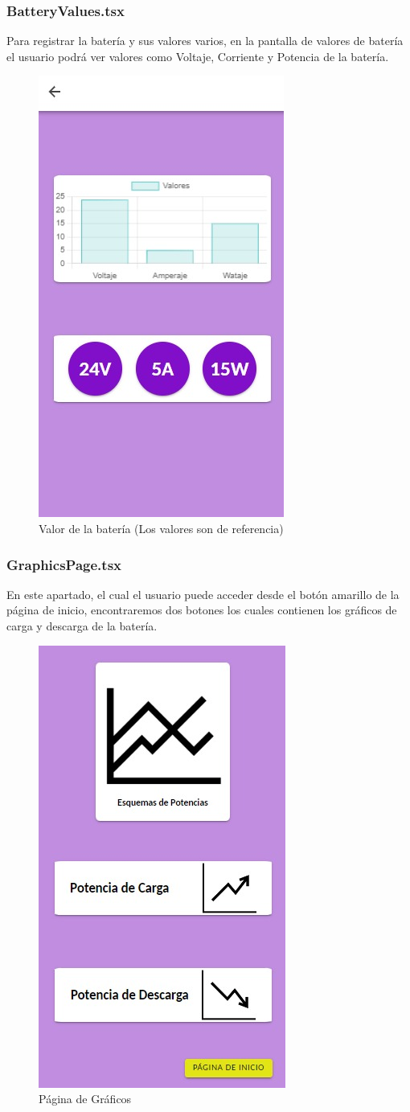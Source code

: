                 \subsubsection{BatteryValues.tsx}
                    Para registrar la batería y sus valores varios, en la pantalla de valores de batería el usuario podrá ver valores como Voltaje, Corriente y Potencia de la batería.\par
    
                    \begin{figure} [H]
                        \centering
                        \includegraphics[width=0.25\linewidth]{Imagenes/Aplicación/Value_Battery.jpg}
                        \caption{Valor de la batería (Los valores son de referencia)}
                        \label{fig:a7}
                    \end{figure}

                \subsubsection{GraphicsPage.tsx}
                    En este apartado, el cual el usuario puede acceder desde el botón amarillo de la página de inicio, encontraremos dos botones los cuales contienen los gráficos de carga y descarga de la batería.\par
    
                    \begin{figure} [H]
                        \centering
                        \includegraphics[width=0.25\linewidth]{Imagenes/Aplicación/Graphics_Page.jpg}
                        \caption{Página de Gráficos}
                        \label{fig:a8}
                    \end{figure}

